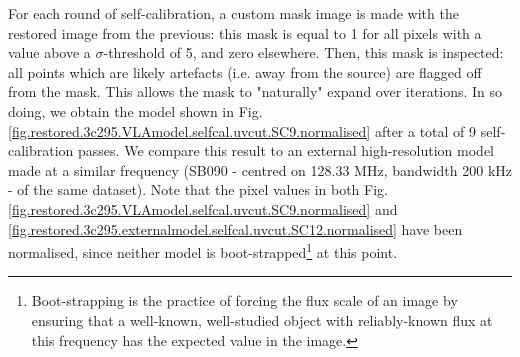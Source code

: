 \pg
For each round of self-calibration, a custom mask image is made with the restored image from the previous: this mask is equal to 1 for all pixels with a value above a $\sigma$-threshold of 5, and zero elsewhere. Then, this mask is inspected: all points which are likely artefacts (i.e. away from the source) are flagged off from the mask. This allows the mask to "naturally" expand over iterations. In so doing, we obtain the model shown in Fig. \ref{fig.restored.3c295.VLAmodel.selfcal.uvcut.SC9.normalised} after a total of 9 self-calibration passes. We compare this result to an external high-resolution model made at a similar frequency (SB090 - centred on 128.33 MHz, bandwidth 200 kHz - of the same dataset). Note that the pixel values in both Fig. \ref{fig.restored.3c295.VLAmodel.selfcal.uvcut.SC9.normalised} and \ref{fig.restored.3c295.externalmodel.selfcal.uvcut.SC12.normalised} have been normalised, since neither model is boot-strapped\footnote{Boot-strapping is the practice of forcing the flux scale of an image by ensuring that a well-known, well-studied object with reliably-known flux at this frequency has the expected value in the image.} at this point.

